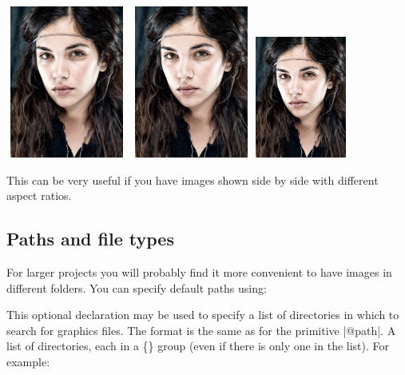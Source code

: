 \centering
\includegraphics[width=0.3\textwidth, height=5cm]{./images/amato.jpg}
\includegraphics[keepaspectratio=true,width=4cm, height=5cm]{./images/amato.jpg}
\includegraphics[width=3cm]{./images/amato.jpg}

\endgroup


This can be very useful if you have images shown side by side with different
aspect ratios. 


\subsection{Paths and file types}

For larger projects you will probably find it more convenient to have 
images in different folders. You can specify default paths using:


\CMDI{\graphicspath}

This optional declaration may be used to specify a list of directories in which to
search for graphics ﬁles. The format is the same as for the \latexe primitive
|@path|. A list of directories, each in a \{\} group (even if there is only one
in the list). For example:


